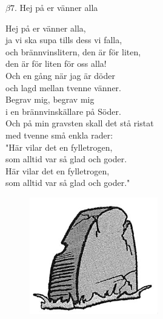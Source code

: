 \documentclass[a6paper,10pt]{article}
\begin{document}
\setlength{\oddsidemargin}{-0.37in}
\begin{center}
\Large $\beta7$. Hej på er vänner alla \\ 
\end{center}
Hej på er vänner alla, \\
ja vi ska supa tills dess vi falla, \\
och brännvinslitern, den är för liten, \\
den är för liten för oss alla! \\
\newline
Och en gång när jag är döder\\ 
och lagd mellan tvenne vänner. \\
Begrav mig, begrav mig \\
i en brännvinskällare på Söder. \\
\newline
Och på min gravsten skall det stå ristat \\
med tvenne små enkla rader: \\
"Här vilar det en fylletrogen, \\
som alltid var så glad och goder.\\ 
Här vilar det en fylletrogen, \\
som alltid var så glad och goder." 
\vspace{35pt} \\
\begin{figure}[!h]
\centering
\includegraphics[width=0.5\textwidth]{gravsten.jpg}
\end{figure}
\end{document}
